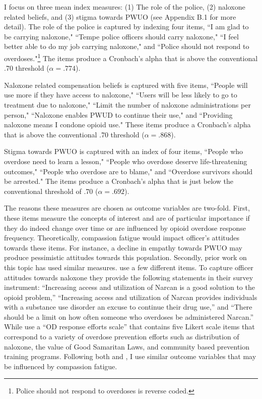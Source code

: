I focus on three mean index measures: (1) The role of the police, (2) naloxone related beliefs, and (3) stigma towards PWUO (see Appendix B.1 for more detail). The role of the police is captured by indexing four items, ``I am glad to be carrying naloxone," ``Tempe police officers should carry naloxone," ``I feel better able to do my job carrying naloxone," and ``Police should not respond to overdoses."\footnote{Police should not respond to overdoses is reverse coded.} The items produce a Cronbach's alpha that is above the conventional .70 threshold (\(\alpha = .774\)).

Naloxone related compensation beliefs is captured with five items, ``People will use more if they have access to naloxone," ``Users will be less likely to go to treatment due to naloxone," ``Limit the number of naloxone administrations per person," ``Naloxone enables PWUD to continue their use," and ``Providing naloxone means I condone opioid use." These items produce a Cronbach's alpha that is above the conventional .70 threshold (\(\alpha = .868\)).

Stigma towards PWUO is captured with an index of four items, ``People who overdose need to learn a lesson," ``People who overdose deserve life-threatening outcomes," ``People who overdose are to blame," and ``Overdose survivors should be arrested." The items produce a Cronbach's alpha that is just below the conventional threshold of .70 (\(\alpha = .692\)).

The reasons these measures are chosen as outcome variables are two-fold. First, these items measure the concepts of interest and are of particular importance if they do indeed change over time or are influenced by opioid overdose response frequency. Theoretically, compassion fatigue would impact officer's attitudes towards these items. For instance, a decline in empathy towards PWUO may produce pessimistic attitudes towards this population. Secondly, prior work on this topic has used similar measures. \textcite{murphy_police_2020} use a few different items. To capture officer attitudes towards naloxone they provide the following statements in their survey instrument: “Increasing access and utilization of Narcan is a good solution to the opioid problem,” “Increasing access and utilization of Narcan provides individuals with a substance use disorder an excuse to continue their drug use,” and “There should be a limit on how often someone who overdoses be administered Narcan.” While \textcite{carroll_knowledge_2020} use a “OD response efforts scale” that contains five Likert scale items that correspond to a variety of overdose prevention efforts such as distribution of naloxone, the value of Good Samaritan Laws, and community based prevention training programs. Following both \textcite{murphy_police_2020} and \textcite{carroll_knowledge_2020}, I use similar outcome variables that may be influenced by compassion fatigue. 

